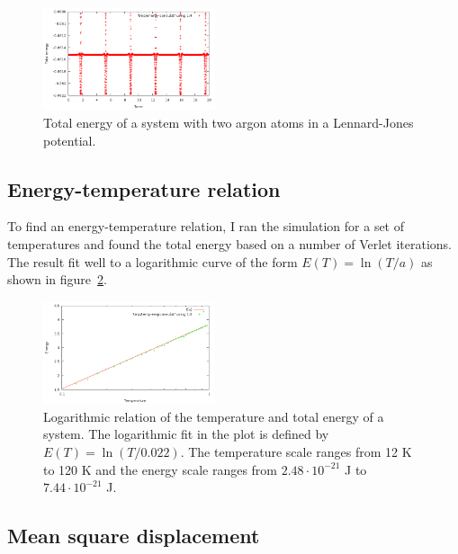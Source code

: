 \documentclass[twocolumn]{revtex4}
\begin{document}
\begin{figure}[htb]
\begin{center}
\leavevmode
\includegraphics[width=0.45\textwidth]{energy-cons.png}
\end{center}
\caption{Total energy of a system with two argon atoms in a Lennard-Jones potential.}
\label{fig:energy-cons}
\end{figure}

\subsection{Energy-temperature relation}

To find an energy-temperature relation, I ran the simulation for a set of temperatures and found the total energy based on a number of Verlet iterations. The result fit well to a logarithmic curve of the form $E(T)=\ln(T/a)$ as shown in figure~\ref{fig:temp-response}.

\begin{figure}[htb]
\begin{center}
\leavevmode
\includegraphics[width=0.45\textwidth]{temp-response.png}
\end{center}
\caption{Logarithmic relation of the temperature and total energy of a system. The logarithmic fit in the plot is defined by $E(T) = \ln(T/0.022)$. The temperature scale ranges from 12 K to 120 K and the energy scale ranges from $2.48\cdot10^{-21}$ J to $7.44\cdot10^{-21}$ J.}
\label{fig:temp-response}
\end{figure}

\subsection{Mean square displacement}
\end{document}

